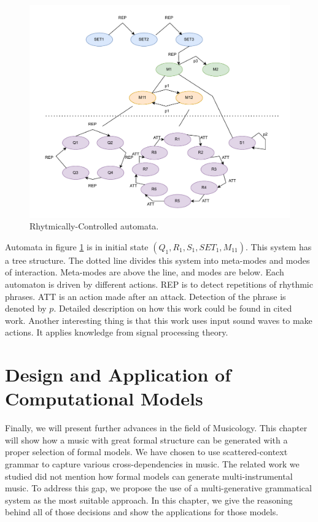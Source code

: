 \begin{figure}[H]
    \centering
    \includegraphics[scale=0.6]{obrazky-figures/automaton.drawio.pdf}
    \caption{Rhytmically-Controlled automata.}
    \label{fig:automataphd}
\end{figure}

Automata in figure \ref{fig:automataphd} is in initial state $(Q_1, R_1, S_1, SET_1, M_{11})$. This system has a tree structure. The dotted line divides this system into meta-modes and modes of interaction. Meta-modes are above the line, and modes are below. Each automaton is driven by different actions. REP is to detect repetitions of rhythmic phrases. ATT is an action made after an attack. Detection of the phrase is denoted by $p$. Detailed description on how this work could be found in cited work. Another interesting thing is that this work uses input sound waves to make actions. It applies knowledge from signal processing theory.

\chapter{Design and Application of Computational Models}
\label{chap4}
Finally, we will present further advances in the field of Musicology. This chapter will show how a music with great formal structure can be generated with a proper selection of formal models. We have chosen to use scattered-context grammar to capture various cross-dependencies in music. The related work we studied did not mention how formal models can generate multi-instrumental music. To address this gap, we propose the use of a multi-generative grammatical system as the most suitable approach. In this chapter, we give the reasoning behind all of those decisions and show the applications for those models.

